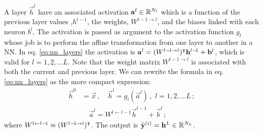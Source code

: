
    A layer $\vec{h}^l$ have an associated activation $\vec{a}^l \in \RR[N_l]$ which is a function of the previous layer values ,$h^{l-\!1}$, the weights, $W^{l-\!1\to l}$, and the biases linked with each neuron $b^l$. The activation is passed as argument to the activation function $g_l$ whose job is to perform the affine transformation from one layer to another in a NN. In eq. \eqref{eq:nn_layers} the activation is $\vec{a}^l = (W^{l-\! 1\to l})\TT\vec{h}^{l -\!1} + \vec{b}^l$, which is valid for $l= 1, 2,\dots L$. Note that the weight matrix $W^{l-\! 1\to l}$ is associated with both the current and previous layer. We can rewrite the formula in eq. \eqref{eq:nn_layers} as the more compact expression:
    \begin{equation}
        \begin{split}
            \vec{h}^0 &= \vec{x} \,,\quad \vec{h}^l =  g_l(\vec{a}^l)\,, \, \, l=1,2, \dots L \,; \\
            &\quad \vec{a}^l = W^{l\leftarrow l-\!1}\vec{h}^{l -\!1} + \vec{b}^l \,;
        \end{split}
    \end{equation}
    where $W^{l\leftarrow l-\!1} \equiv (W^{l-\! 1\to l})\TT$. The output is $\hat{\vec{y}}^{(i)} = \vec{h}^L \in \RR[N_L]$.


